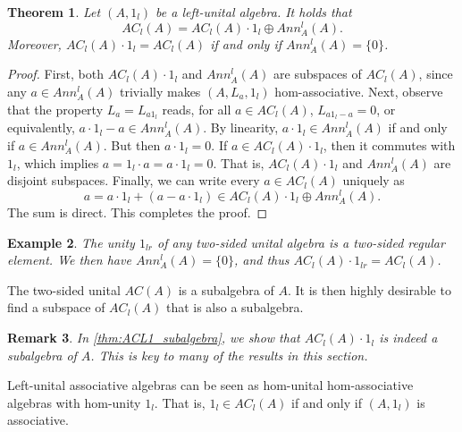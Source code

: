\documentclass[12pt]{article}
\newtheorem{theorem}{Theorem}
\newtheorem{example}[theorem]{Example}
\newtheorem{remark}[theorem]{Remark}
\begin{document}
		
		\begin{theorem}\label{thm:ACL_split}
			Let $(A,1_l)$ be a left-unital algebra. It holds that
			\begin{equation}\label{eqn:split-of-ACL}
				AC_l(A)=AC_l(A)\cdot 1_l\oplus Ann_A^l(A).
			\end{equation}
			Moreover, $AC_l(A)\cdot 1_l=AC_l(A)$ if and only if $Ann_A^l(A)=\{0\}$.
		\end{theorem}
		\begin{proof}
			First, both $AC_l(A)\cdot 1_l$ and $Ann_A^l(A)$ are subspaces of $AC_l(A)$, since any $a\in Ann_A^l(A)$ trivially makes $(A,L_a,1_l)$ hom-associative.
			Next, observe that the property $L_a=L_{a1_l}$ reads, for all $a\in AC_l(A)$, $L_{a1_l-a}=0$, or equi\-valently, $a\cdot 1_l-a\in Ann_A^l(A)$. By linearity, $a\cdot 1_l\in Ann_A^l(A)$ if and only if $a\in Ann_A^l(A)$. But then $a\cdot 1_l=0$. If $a\in AC_l(A)\cdot 1_l$, then it commutes with $1_l$, which implies $a=1_l\cdot a=a\cdot 1_l=0$. That is, $AC_l(A)\cdot 1_l$ and $Ann_A^l(A)$ are disjoint subspaces. Finally, we can write every $a\in AC_l(A)$ uniquely as
			\begin{equation*}
				a=a\cdot 1_l+(a-a\cdot 1_l)\in AC_l(A)\cdot 1_l\oplus Ann_A^l(A).
			\end{equation*}
			The sum is direct. This completes the proof.
		\end{proof}
		\begin{example}
			The unity $1_{lr}$ of any two-sided unital algebra is a two-sided regular element. We then have $Ann_A^l(A)=\{0\}$, and thus $AC_l(A)\cdot 1_{lr}=AC_l(A)$.
		\end{example}
		
		The two-sided unital $AC(A)$ is a subalgebra of $A$. It is then highly desirable to find a subspace of $AC_l(A)$ that is also a subalgebra.
		\begin{remark}
			In \cref{thm:ACL1_subalgebra}, we show that $AC_l(A)\cdot 1_l$ is indeed a subalgebra of $A$. This is key to many of the results in this section.
		\end{remark}
		
		Left-unital associative algebras can be seen as hom-unital hom-associative algebras with hom-unity $1_l$. That is, $1_l\in AC_l(A)$ if and only if $(A,1_l)$ is associative.
		
\end{document}
